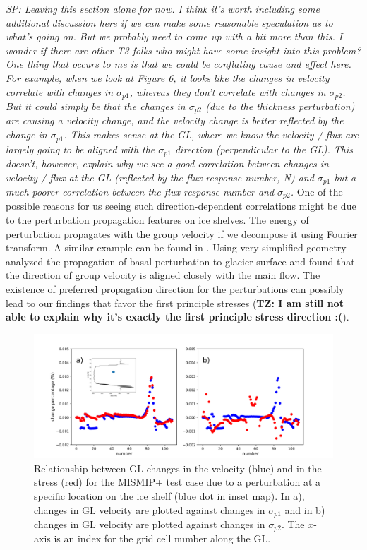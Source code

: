 \documentclass[review,oneside]{igs}
\begin{document}
\textit{SP: Leaving this section alone for now. I think it's worth including some additional discussion here if we can make some reasonable speculation as to what's going on. But we probably need to come up with a bit more than this. I wonder if there are other T3 folks who might have some insight into this problem? One thing that occurs to me is that we could be conflating cause and effect here. For example, when we look at Figure 6, it looks like the changes in velocity correlate with changes in $\sigma_{p1}$, whereas they don't correlate with changes in $\sigma_{p2}$. But it could simply be that the changes in $\sigma_{p2}$ (due to the thickness perturbation) are causing a velocity change, and the velocity change is better reflected by the change in $\sigma_{p1}$. This makes sense at the GL, where we know the velocity / flux are largely going to be aligned with the $\sigma_{p1}$ direction (perpendicular to the GL). This doesn't, however, explain why we see a good correlation between changes in velocity / flux at the GL (reflected by the flux response number, N) and $\sigma_{p1}$ but a much poorer correlation between the flux response number and $\sigma_{p2}$.} One of the possible reasons for us seeing such direction-dependent correlations might be due to the perturbation propagation features on ice shelves. The energy of perturbation propagates with the group velocity if we decompose it using Fourier transform. A similar example can be found in \citep{gudmundsson2003}. Using very simplified geometry \cite{gudmundsson2003} analyzed the propagation of basal perturbation to glacier surface and found that the direction of group velocity is aligned closely with the main flow. The existence of preferred propagation direction for the perturbations can possibly lead to our findings that favor the first principle stresses ({\bf{TZ: I am still not able to explain why it's exactly the first principle stress direction :(}}). 

\begin{figure}
	\centering
    \includegraphics[width=1\linewidth]{figs/fig6_new.pdf}
    \caption{Relationship between GL {changes} in the velocity (blue) and in the stress (red) for the MISMIP+ test case due to a perturbation at a specific location on the ice shelf (blue dot in inset map). In a), changes in GL velocity are plotted against changes in $\sigma_{p1}$ and in b) changes in GL velocity are plotted against changes in $\sigma_{p2}$. The $x$-axis is an index for the grid cell number along the GL.}
	\label{fig6}
\end{figure}
\end{document}
